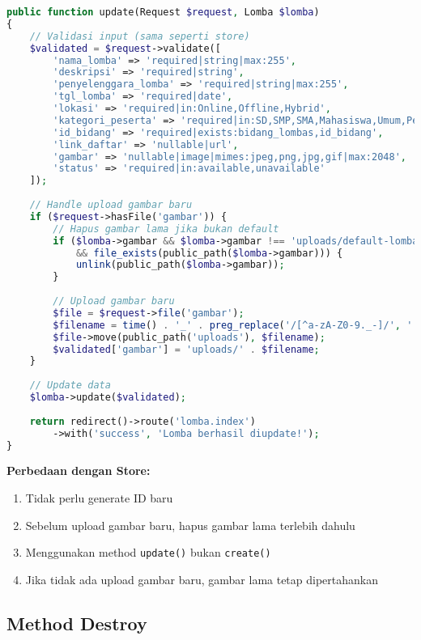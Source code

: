 \documentclass[12pt,a4paper]{article}
\begin{document}
\begin{lstlisting}[language=PHP]
public function update(Request $request, Lomba $lomba)
{
    // Validasi input (sama seperti store)
    $validated = $request->validate([
        'nama_lomba' => 'required|string|max:255',
        'deskripsi' => 'required|string',
        'penyelenggara_lomba' => 'required|string|max:255',
        'tgl_lomba' => 'required|date',
        'lokasi' => 'required|in:Online,Offline,Hybrid',
        'kategori_peserta' => 'required|in:SD,SMP,SMA,Mahasiswa,Umum,Pelajar',
        'id_bidang' => 'required|exists:bidang_lombas,id_bidang',
        'link_daftar' => 'nullable|url',
        'gambar' => 'nullable|image|mimes:jpeg,png,jpg,gif|max:2048',
        'status' => 'required|in:available,unavailable'
    ]);
    
    // Handle upload gambar baru
    if ($request->hasFile('gambar')) {
        // Hapus gambar lama jika bukan default
        if ($lomba->gambar && $lomba->gambar !== 'uploads/default-lomba.jpg' 
            && file_exists(public_path($lomba->gambar))) {
            unlink(public_path($lomba->gambar));
        }
        
        // Upload gambar baru
        $file = $request->file('gambar');
        $filename = time() . '_' . preg_replace('/[^a-zA-Z0-9._-]/', '', $file->getClientOriginalName());
        $file->move(public_path('uploads'), $filename);
        $validated['gambar'] = 'uploads/' . $filename;
    }
    
    // Update data
    $lomba->update($validated);
    
    return redirect()->route('lomba.index')
        ->with('success', 'Lomba berhasil diupdate!');
}
\end{lstlisting}

\textbf{Perbedaan dengan Store:}
\begin{enumerate}
    \item Tidak perlu generate ID baru
    \item Sebelum upload gambar baru, hapus gambar lama terlebih dahulu
    \item Menggunakan method \texttt{update()} bukan \texttt{create()}
    \item Jika tidak ada upload gambar baru, gambar lama tetap dipertahankan
\end{enumerate}

\subsection{Method Destroy}
\end{document}
